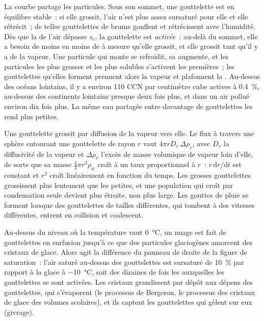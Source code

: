 La courbe partage les particules. Sous son sommet, une gouttelette est en équilibre stable~: si elle grossit,
l'air n'est plus assez sursaturé pour elle et elle rétrécit~; de telles gouttelettes de brume gonflent et
rétrécissent avec l'humidité. Dès que la  de l'air dépasse $s_c$, la gouttelette est \emph{activée}~:
au-delà du sommet, elle a besoin de moins en moins de  à mesure qu'elle grossit, et elle grossit
tant qu'il y a de la vapeur. Une particule qui monte se refroidit, sa  augmente, et les particules
les plus grosses et les plus solubles s'activent les premières~; les gouttelettes qu'elles forment prennent
alors la vapeur et plafonnent la . Au-dessus des océans lointains, il y a environ 110 CCN par centimètre
cube actives à \qty{0.4}{\percent}, au-dessus des continents lointains presque deux fois plus, et dans un
air pollué environ dix fois plus. La même eau partagée entre davantage de gouttelettes les rend plus petites.

\begin{remark}\label{rem:b2:atmospheric-thermodynamics:growth}
Une gouttelette grossit par diffusion de la vapeur vers elle. Le flux à travers une sphère entourant une
gouttelette de rayon $r$ vaut $4\pi r D_v\,\Delta\rho_v$, avec $D_v$ la diffusivité de la vapeur et $\Delta\rho_v$
l'excès de masse volumique de vapeur loin d'elle, de sorte que sa masse $\tfrac43\pi r^3\rho_w$ croît à un
taux proportionnel à $r$~: $r\,\mathrm{d}r/\mathrm{d}t$ est constant et $r^2$ croît linéairement en fonction
du temps. Les grosses gouttelettes grossissent plus lentement que les petites, et une population qui croît
par condensation seule devient plus étroite, non plus large. Les gouttes de pluie se forment lorsque des
gouttelettes de tailles différentes, qui tombent à des vitesses différentes, entrent en collision et coalescent.
\end{remark}

Au-dessus du niveau où la température vaut \qty{0}{\celsius}, un nuage est fait de gouttelettes en
surfusion jusqu'à ce que des particules glaciogènes amorcent des cristaux de glace. Alors agit la
différence du panneau de droite de la figure de saturation~: l'air saturé au-dessus des gouttelettes est
sursaturé de \qty{10}{\percent} par rapport à la glace à \qty{-10}{\celsius}, soit des dizaines de
fois les  auxquelles les gouttelettes se sont activées. Les cristaux grandissent par
dépôt aux dépens des gouttelettes, qui s'évaporent (le processus de Bergeron, le processus des
cristaux de glace des volumes scolaires), et ils captent les gouttelettes qui gèlent sur eux (givrage).

